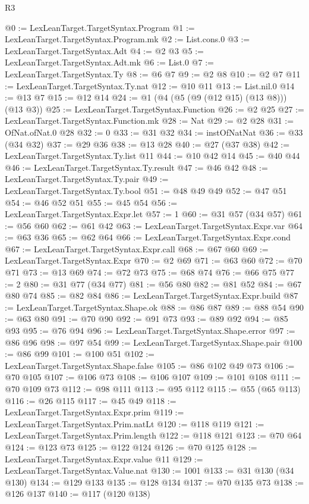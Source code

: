 \begin{lexlean}{R3}
\begin{coremodule}
{{{{{{{{{{{{{{{{{{{{{{{{{{@0 := LexLeanTarget.TargetSyntax.Program
@1 := LexLeanTarget.TargetSyntax.Program.mk
@2 := List.cons.{0}
@3 := LexLeanTarget.TargetSyntax.Adt
@4 := @2 @3
@5 := LexLeanTarget.TargetSyntax.Adt.mk
@6 := List.{0}
@7 := LexLeanTarget.TargetSyntax.Ty
@8 := @6 @7
@9 := @2 @8
@10 := @2 @7
@11 := LexLeanTarget.TargetSyntax.Ty.nat
@12 := @10 @11
@13 := List.nil.{0}
@14 := @13 @7
@15 := @12 @14
@24 := @1 (@4 (@5 (@9 (@12 @15) (@13 @8))) (@13 @3))
@25 := LexLeanTarget.TargetSyntax.Function
@26 := @2 @25
@27 := LexLeanTarget.TargetSyntax.Function.mk
@28 := Nat
@29 := @2 @28
@31 := OfNat.ofNat.{0} @28
@32 := 0
@33 := @31 @32
@34 := instOfNatNat
@36 := @33 (@34 @32)
@37 := @29 @36
@38 := @13 @28
@40 := @27 (@37 @38)
@42 := LexLeanTarget.TargetSyntax.Ty.list @11
@44 := @10 @42 @14
@45 := @40 @44
@46 := LexLeanTarget.TargetSyntax.Ty.result
@47 := @46 @42
@48 := LexLeanTarget.TargetSyntax.Ty.pair
@49 := LexLeanTarget.TargetSyntax.Ty.bool
@51 := @48 @49 @49
@52 := @47 @51
@54 := @46 @52 @51
@55 := @45 @54
@56 := LexLeanTarget.TargetSyntax.Expr.let
@57 := 1
@60 := @31 @57 (@34 @57)
@61 := @56 @60
@62 := @61 @42
@63 := LexLeanTarget.TargetSyntax.Expr.var
@64 := @63 @36
@65 := @62 @64
@66 := LexLeanTarget.TargetSyntax.Expr.cond
@67 := LexLeanTarget.TargetSyntax.Expr.call
@68 := @67 @60
@69 := LexLeanTarget.TargetSyntax.Expr
@70 := @2 @69
@71 := @63 @60
@72 := @70 @71
@73 := @13 @69
@74 := @72 @73
@75 := @68 @74
@76 := @66 @75
@77 := 2
@80 := @31 @77 (@34 @77)
@81 := @56 @80
@82 := @81 @52
@84 := @67 @80 @74
@85 := @82 @84
@86 := LexLeanTarget.TargetSyntax.Expr.build
@87 := LexLeanTarget.TargetSyntax.Shape.ok
@88 := @86 @87
@89 := @88 @54
@90 := @63 @80
@91 := @70 @90
@92 := @91 @73
@93 := @89 @92
@94 := @85 @93
@95 := @76 @94
@96 := LexLeanTarget.TargetSyntax.Shape.error
@97 := @86 @96
@98 := @97 @54
@99 := LexLeanTarget.TargetSyntax.Shape.pair
@100 := @86 @99
@101 := @100 @51
@102 := LexLeanTarget.TargetSyntax.Shape.false
@105 := @86 @102 @49 @73
@106 := @70 @105
@107 := @106 @73
@108 := @106 @107
@109 := @101 @108
@111 := @70 @109 @73
@112 := @98 @111
@113 := @95 @112
@115 := @55 (@65 @113)
@116 := @26 @115
@117 := @45 @49
@118 := LexLeanTarget.TargetSyntax.Expr.prim
@119 := LexLeanTarget.TargetSyntax.Prim.natLt
@120 := @118 @119
@121 := LexLeanTarget.TargetSyntax.Prim.length
@122 := @118 @121
@123 := @70 @64
@124 := @123 @73
@125 := @122 @124
@126 := @70 @125
@128 := LexLeanTarget.TargetSyntax.Expr.value @11
@129 := LexLeanTarget.TargetSyntax.Value.nat
@130 := 1001
@133 := @31 @130 (@34 @130)
@134 := @129 @133
@135 := @128 @134
@137 := @70 @135 @73
@138 := @126 @137
@140 := @117 (@120 @138)
}}}}}}}}}}}}}}}}}}}}}}}}}}
\end{coremodule}
\end{lexlean}
